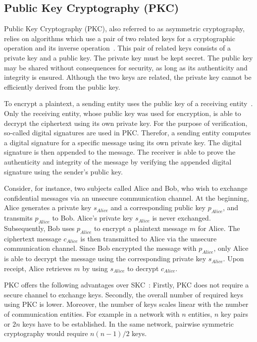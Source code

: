 \subsection{Public Key Cryptography (PKC)}
Public Key Cryptography (PKC), also referred to as asymmetric cryptography, relies on algorithms which use a pair of two related keys for a cryptographic operation and its inverse operation~\cite{Barker2020,CNSS2022,Eckert2023}.
This pair of related keys consists of a private key and a public key.
The private key must be kept secret.
The public key may be shared without consequences for security, as long as its authenticity and integrity is ensured.
Although the two keys are related, the private key cannot be efficiently derived from the public key.

To encrypt a plaintext, a sending entity uses the public key of a receiving entity~\cite{Boneh2023}.
Only the receiving entity, whose public key was used for encryption, is able to decrypt the ciphertext using its own private key.
For the purpose of verification, so-called digital signatures are used in PKC.
Therefor, a sending entity computes a digital signature for a specific message using its own private key.
The digital signature is then appended to the message.
The receiver is able to prove the authenticity and integrity of the message by verifying the appended digital signature using the sender's public key.

Consider, for instance, two subjects called Alice and Bob, who wish to exchange confidential messages via an unsecure communication channel.
At the beginning, Alice generates a private key $s_{Alice}$ and a corresponding public key $p_{Alice}$, and transmits $p_{Alice}$ to Bob.
Alice's private key $s_{Alice}$ is never exchanged.
Subsequently, Bob uses $p_{Alice}$ to encrypt a plaintext message $m$ for Alice.
The ciphertext message $c_{Alice}$ is then transmitted to Alice via the unsecure communication channel.
Since Bob encrypted the message with $p_{Alice}$, only Alice is able to decrypt the message using the corresponding private key $s_{Alice}$.
Upon receipt, Alice retrieves $m$ by using $s_{Alice}$ to decrypt $c_{Alice}$.

PKC offers the following advantages over SKC~\cite{Barker2020,Eckert2023}:
Firstly, PKC does not require a secure channel to exchange keys.
Secondly, the overall number of required keys using PKC is lower.
Moreover, the number of keys scales linear with the number of communication entities.
For example in a network with $n$ entities, $n$ key pairs or $2n$ keys have to be established.
In the same network, pairwise symmetric cryptography would require $n(n-1)/2$ keys.

